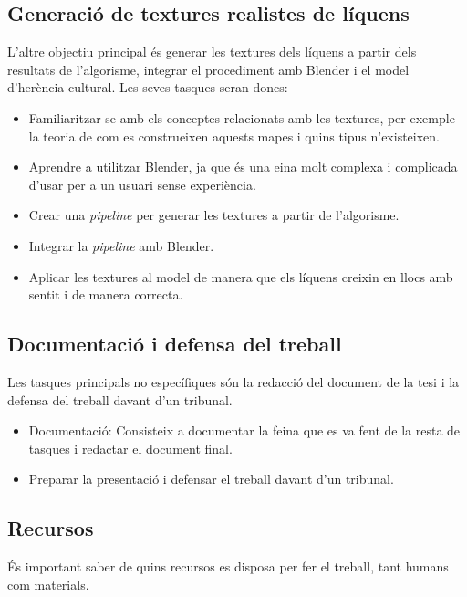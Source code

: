 \documentclass{article}
\begin{document}
\subsection{Generació de textures realistes de líquens}

L'altre objectiu principal és generar les textures dels líquens a partir dels resultats de l'algorisme, integrar el procediment amb Blender i el model d'herència cultural. Les seves tasques seran doncs:

\begin{itemize}
    \item Familiaritzar-se amb els conceptes relacionats amb les textures, per exemple la teoria de com es construeixen aquests mapes i quins tipus n'existeixen.
    \item Aprendre a utilitzar Blender, ja que és una eina molt complexa i complicada d'usar per a un usuari sense experiència.
    \item Crear una \textit{pipeline} per generar les textures a partir de l'algorisme.
    \item Integrar la \textit{pipeline} amb Blender.
    \item Aplicar les textures al model de manera que els líquens creixin en llocs amb sentit i de manera correcta.
\end{itemize}

\subsection{Documentació i defensa del treball}

Les tasques principals no específiques són la redacció del document de la tesi i la defensa del treball davant d'un tribunal.

\begin{itemize}
    \item Documentació: Consisteix a documentar la feina que es va fent de la resta de tasques i redactar el document final.
    \item Preparar la presentació i defensar el treball davant d'un tribunal.
\end{itemize}

\subsection{Recursos}

És important saber de quins recursos es disposa per fer el treball, tant humans com materials.
\end{document}
